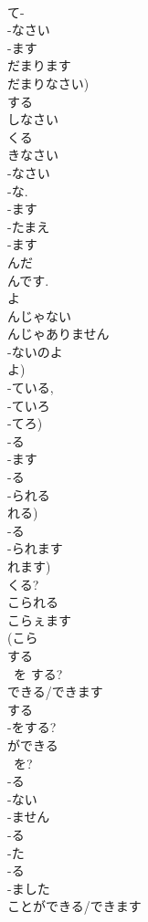 \documentclass[8pt]{extreport}
\begin{document}
\begin{CJK}{UTF8}{min}
\\	て-
\\	-なさい 
\\	-ます
\\	だまります 
\\	だまりなさい) 
\\	する 
\\	しなさい 
\\	くる 
\\	きなさい 
\\	-なさい 
\\	-な. 
\\	-ます 
\\	-たまえ 
\\	-ます
\\	んだ 
\\	んです. 
\\	よ 
\\	んじゃない 
\\	んじゃありません	
\\	-ないのよ 
\\	よ)	
\\	-ている, 
\\	-ていろ 
\\	-てろ)	
\\	-る 
\\	-ます
\\	-る 
\\	-られる 
\\	れる) 
\\	-る 
\\	-られます
\\	れます)	
\\	くる?
\\	こられる 
\\	こらぇます	
\\	(こら 
\\	する 
\\	~を する?
\\	できる/できます	
\\	する 
\\	-をする?
\\	ができる	
\\	~を?
\\	-る 
\\	-ない 
\\	-ません 
\\	-る 
\\	-た 
\\	-る 
\\	-ました	
\\	ことができる/できます 

\end{CJK}
\end{document}
